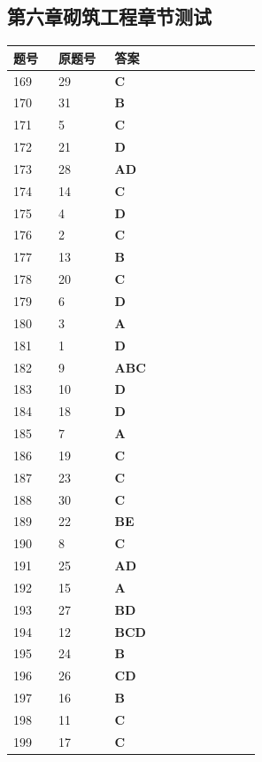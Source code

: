 \documentclass[UTF8,fontset=windows,11pt]{ctexart}
\begin{document}
\subsection*{第六章砌筑工程章节测试}
\begin{longtable}{p{0.16\linewidth}p{0.2\linewidth}p{0.52\linewidth}}
\textbf{\textcolor{examnavy}{题号}} & \textbf{\textcolor{examnavy}{原题号}} & \textbf{\textcolor{answergreen}{答案}} \\
\hline
169 & 29 & \textbf{\textcolor{answergreen}{C}} \\
170 & 31 & \textbf{\textcolor{answergreen}{B}} \\
171 & 5 & \textbf{\textcolor{answergreen}{C}} \\
172 & 21 & \textbf{\textcolor{answergreen}{D}} \\
173 & 28 & \textbf{\textcolor{answergreen}{AD}} \\
174 & 14 & \textbf{\textcolor{answergreen}{C}} \\
175 & 4 & \textbf{\textcolor{answergreen}{D}} \\
176 & 2 & \textbf{\textcolor{answergreen}{C}} \\
177 & 13 & \textbf{\textcolor{answergreen}{B}} \\
178 & 20 & \textbf{\textcolor{answergreen}{C}} \\
179 & 6 & \textbf{\textcolor{answergreen}{D}} \\
180 & 3 & \textbf{\textcolor{answergreen}{A}} \\
181 & 1 & \textbf{\textcolor{answergreen}{D}} \\
182 & 9 & \textbf{\textcolor{answergreen}{ABC}} \\
183 & 10 & \textbf{\textcolor{answergreen}{D}} \\
184 & 18 & \textbf{\textcolor{answergreen}{D}} \\
185 & 7 & \textbf{\textcolor{answergreen}{A}} \\
186 & 19 & \textbf{\textcolor{answergreen}{C}} \\
187 & 23 & \textbf{\textcolor{answergreen}{C}} \\
188 & 30 & \textbf{\textcolor{answergreen}{C}} \\
189 & 22 & \textbf{\textcolor{answergreen}{BE}} \\
190 & 8 & \textbf{\textcolor{answergreen}{C}} \\
191 & 25 & \textbf{\textcolor{answergreen}{AD}} \\
192 & 15 & \textbf{\textcolor{answergreen}{A}} \\
193 & 27 & \textbf{\textcolor{answergreen}{BD}} \\
194 & 12 & \textbf{\textcolor{answergreen}{BCD}} \\
195 & 24 & \textbf{\textcolor{answergreen}{B}} \\
196 & 26 & \textbf{\textcolor{answergreen}{CD}} \\
197 & 16 & \textbf{\textcolor{answergreen}{B}} \\
198 & 11 & \textbf{\textcolor{answergreen}{C}} \\
199 & 17 & \textbf{\textcolor{answergreen}{C}} \\
\end{longtable}
\vspace{0.4em}
\end{document}
